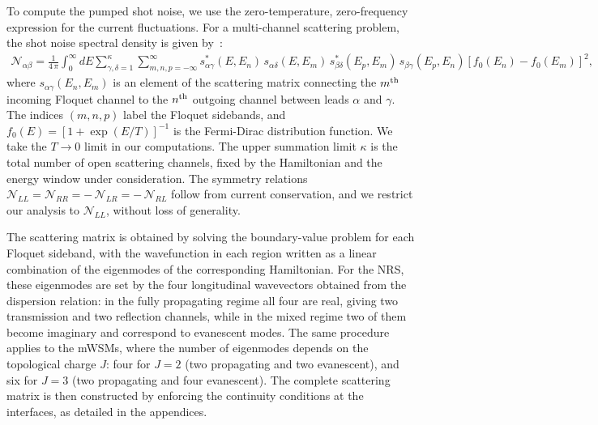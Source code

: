 \documentclass[aps,prb,onecolumn,longbibliography,nofootinbib,citeautoscript,10pt]{revtex4-2}
\begin{document}
To compute the pumped shot noise, we use the zero-temperature, zero-frequency expression for the current fluctuations. For a multi-channel scattering problem, the shot noise spectral density is given by~\cite{Zhu15, reichl199, Dai2014, Zhu17, bera2021, bera2023}:
\begin{align}
	\mathcal{N}_{\alpha \beta} = \frac{1} {4\,\pi} 
	\int_{0}^{\infty} dE \sum_{\gamma,\delta=1}^{\kappa} \sum_{m,n,p=-\infty}^{\infty}  
s^*_{\alpha \gamma}(E,E_n) \,s_{\alpha \delta}(E,E_m) \,s^*_{\beta \delta}(E_p,E_m) \,s_{\beta \gamma}(E_p,E_n) \left[ f_0(E_n) - f_0(E_m) \right]^2,
	\label{eq:shotnoise_general}
\end{align}
where $s_{\alpha \gamma}(E_n, E_m)$ is an element of the scattering matrix connecting the $m^{\rm th} $ incoming Floquet channel to the $n^{\rm th}$ outgoing channel between leads $\alpha$ and $\gamma$. The indices $(m,n,p)$ label the Floquet sidebands, and $f_0(E) = [1 + \exp(E/ T)]^{-1}$ is the Fermi-Dirac distribution function. We take the $T \to 0 $ limit in our computations. The upper summation limit $\kappa$ is the total number of open scattering channels, fixed by the Hamiltonian and the energy window under consideration. The symmetry relations $\mathcal{N}_{LL} = \mathcal{N}_{RR} = - \, \mathcal{N}_{LR} = - \, \mathcal{N}_{RL}$ follow from current conservation, and we restrict our analysis to $\mathcal{N}_{LL}$, without loss of generality.

The scattering matrix is obtained by solving the boundary-value problem for each Floquet sideband, with the wavefunction in each region written as a linear combination of the eigenmodes of the corresponding Hamiltonian. For the NRS, these eigenmodes are set by the four longitudinal wavevectors obtained from the dispersion relation: in the fully propagating regime all four are real, giving two transmission and two reflection channels, while in the mixed regime two of them become imaginary and correspond to evanescent modes. The same procedure applies to the mWSMs, where the number of eigenmodes depends on the topological charge $J$: four for $J=2$ (two propagating and two evanescent), and six for $J=3$ (two propagating and four evanescent). The complete scattering matrix is then constructed by enforcing the continuity conditions at the interfaces, as detailed in the appendices.
\end{document}
